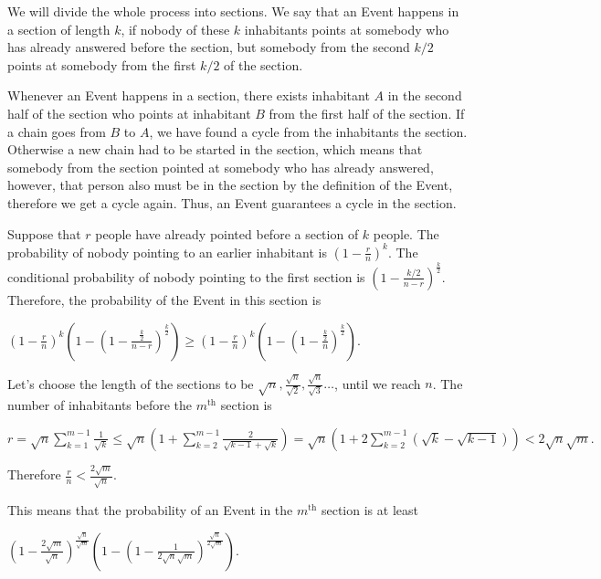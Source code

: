 \documentclass{article}
\begin{document}
We will divide the whole process into sections. We say that an Event happens in a section of length \(\displaystyle k\), if nobody of these \(\displaystyle k\) inhabitants points at somebody who has already answered before the section, but somebody from the second \(\displaystyle k/2\) points at somebody from the first \(\displaystyle k/2\) of the section.

Whenever an Event happens in a section, there exists inhabitant \(\displaystyle A\) in the second half of the section who points at inhabitant \(\displaystyle B\) from the first half of the section. If a chain goes from \(\displaystyle B\) to \(\displaystyle A\), we have found a cycle from the inhabitants the section. Otherwise a new chain had to be started in the section, which means that somebody from the section pointed at somebody who has already answered, however, that person also must be in the section by the definition of the Event, therefore we get a cycle again. Thus, an Event guarantees a cycle in the section.

Suppose that \(\displaystyle r\) people have already pointed before a section of \(\displaystyle k\) people. The probability of nobody pointing to an earlier inhabitant is \(\displaystyle (1-\frac{r}{n})^k\). The conditional probability of nobody pointing to the first section is \(\displaystyle (1-\frac{k/2}{n-r})^{\frac{k}{2}}\). Therefore, the probability of the Event in this section is

\(\displaystyle \left(1-\frac{r}{n}\right)^k\left(1-\left(1-\frac{\frac{k}{2}}{n-r}\right)^{\frac{k}{2}}\right)\ge \left(1-\frac{r}{n}\right)^k\left(1-\left(1-\frac{\frac{k}{2}}{n}\right)^{\frac{k}{2}}\right).\)

Let's choose the length of the sections to be \(\displaystyle \sqrt{n}, \frac{\sqrt{n}}{\sqrt{2}}, \frac{\sqrt{n}}{\sqrt{3}} \ldots\), until we reach \(\displaystyle n\). The number of inhabitants before the \(\displaystyle m^{\text{th}}\) section is

\(\displaystyle r=\sqrt{n} \sum_{k=1}^{m-1} \frac{1}{\sqrt{k}}\le \sqrt{n} \left(1+\sum_{k=2}^{m-1} \frac{2}{\sqrt{k-1}+\sqrt{k}}\right)=\sqrt{n}\left(1+2\sum_{k=2}^{m-1} (\sqrt{k}-\sqrt{k-1})\right) < 2\sqrt{n}\sqrt{m}.\)

Therefore \(\displaystyle \frac{r}{n} < \frac{2\sqrt{m}}{\sqrt{n}}\).

This means that the probability of an Event in the \(\displaystyle m^{\text{th}}\) section is at least

\(\displaystyle \left(1-\frac{2\sqrt{m}}{\sqrt{n}}\right)^{\frac{\sqrt{n}}{\sqrt{m}}}\left(1-\left(1-\frac{1}{2\sqrt{n}\sqrt{m}}\right)^{\frac{\sqrt{n}}{2\sqrt{m}}}\right).\)
\end{document}
